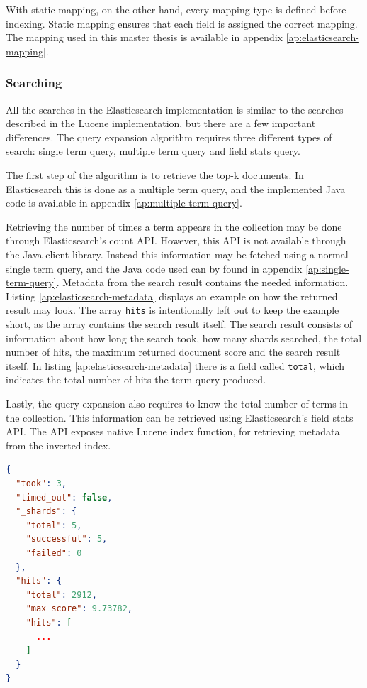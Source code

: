 With static mapping, on the other hand, every mapping type is defined before indexing.
Static mapping ensures that each field is assigned the correct mapping.
The mapping used in this master thesis is available in appendix \ref{ap:elasticsearch-mapping}.

\subsubsection{Searching}
All the searches in the Elasticsearch implementation is similar to the searches described in the Lucene implementation,
but there are a few important differences.
The query expansion algorithm requires three different types of search:
single term query, multiple term query and field stats query.

The first step of the algorithm is to retrieve the top-k documents.
In Elasticsearch this is done as a multiple term query,
and the implemented Java code is available in appendix \ref{ap:multiple-term-query}.

Retrieving the number of times a term appears in the collection may be done through Elasticsearch's count API.
However, this API is not available through the Java client library.
Instead this information may be fetched using a normal single term query,
and the Java code used can by found in appendix \ref{ap:single-term-query}.
Metadata from the search result contains the needed information.
Listing \ref{ap:elasticsearch-metadata} displays an example on how the returned result may look.
The array \texttt{hits} is intentionally left out to keep the example short,
as the array contains the search result itself.
The search result consists of information about how long the search took, how many shards searched, the total number of hits,
the maximum returned document score and the search result itself.
In listing \ref{ap:elasticsearch-metadata} there is a field called \texttt{total},
which indicates the total number of hits the term query produced.

Lastly, the query expansion also requires to know the total number of terms in the collection.
This information can be retrieved using Elasticsearch's field stats API.
The API exposes native Lucene index function,
for retrieving metadata from the inverted index.

\begin{lstlisting}[language={json}, caption={Example of the metadata returned by Elasticsearch.}, label={ap:elasticsearch-metadata}]
{
  "took": 3,
  "timed_out": false,
  "_shards": {
    "total": 5,
    "successful": 5,
    "failed": 0
  },
  "hits": {
    "total": 2912,
    "max_score": 9.73782,
    "hits": [
      ...
    ]
  }
}
\end{lstlisting}

